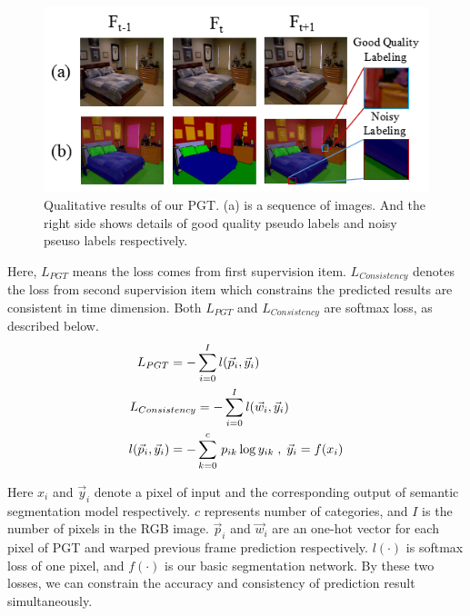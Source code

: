 \begin{figure}[htpb]
	\centering
	\includegraphics[scale=0.65]{figure/PGT.png}
	\caption{Qualitative results of our PGT. (a) is a sequence of images. And the right side shows details of good quality pseudo labels and noisy pseuso labels respectively. }
	\label{fig:PGT}
\end{figure}

Here, ${L_{PGT}}$ means the loss comes from first supervision item.
%
${L_{Consistency}}$ denotes the loss from second supervision item which constrains the predicted results are consistent in time dimension. 
%
Both ${L_{PGT}}$ and ${L_{Consistency}}$ are softmax loss, as described below.
\begin{equation}
{\setlength\abovedisplayskip{8pt}
	\setlength\belowdisplayskip{-8pt}
\centering
\begin{aligned}
L_{PGT} = -&\sum_{i=0}^Il(\vec p_i,\vec y_i) \\
L_{Consistency} &= -\sum_{i=0}^Il(\vec w_i,\vec y_i)\\
l(\vec p_i,\vec y_i) = -&\sum_{k=0}^c \,p_{ik}\log{y_{ik}}\;,\; \vec y_{i} = f(x_{i})\\
\end{aligned}
}
\end{equation}

Here ${x_i}$ and ${\vec y_i}$ denote a pixel of input and the corresponding output of semantic segmentation model respectively. 
%
${c}$ represents number of categories, and ${I}$ is the number of pixels in the RGB image. 
%
${\vec p_i}$ and ${\vec w_i}$ are an one-hot vector for each pixel of PGT and warped previous frame prediction respectively. 
%
${l(\cdot)}$ is softmax loss of one pixel, and ${f(\cdot)}$ is our basic segmentation network. 
%
By these two losses, we can constrain the accuracy and consistency of prediction result simultaneously.
